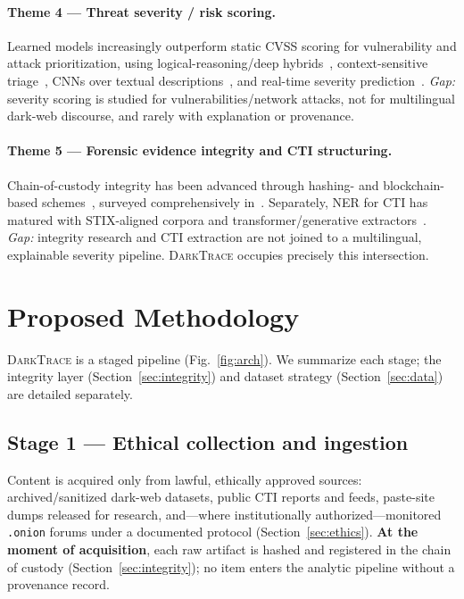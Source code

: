 \documentclass[11pt,a4paper]{article}
\newcommand{\framework}{\textsc{DarkTrace}}
\begin{document}
\paragraph{Theme 4 --- Threat severity / risk scoring.}
Learned models increasingly outperform static CVSS scoring for vulnerability and attack
prioritization, using logical-reasoning/deep hybrids~\cite{zeng2022licality,zeng2024illation},
context-sensitive triage~\cite{hore2023triage}, CNNs over textual
descriptions~\cite{saklani2025severity}, and real-time severity
prediction~\cite{amora2025realtime}. \emph{Gap:} severity scoring is studied for
vulnerabilities/network attacks, not for multilingual dark-web discourse, and rarely
with explanation or provenance.

\paragraph{Theme 5 --- Forensic evidence integrity and CTI structuring.}
Chain-of-custody integrity has been advanced through hashing- and blockchain-based
schemes~\cite{lone2019forensicchain,ali2022procedure,pontecuevas2025blockchain,patil2024potential},
surveyed comprehensively in~\cite{loffi2025management}. Separately, NER for CTI has
matured with STIX-aligned corpora and transformer/generative
extractors~\cite{echchammakhy2025cyberner,feng2025promptbart,wang2022aptner,evangelatos2021ner,kim2020automatic,sorokoletova2024scalable}.
\emph{Gap:} integrity research and CTI extraction are not joined to a multilingual,
explainable severity pipeline. \framework{} occupies precisely this intersection.

\section{Proposed Methodology}\label{sec:methodology}

\framework{} is a staged pipeline (Fig.~\ref{fig:arch}). We summarize each stage; the
integrity layer (Section~\ref{sec:integrity}) and dataset strategy
(Section~\ref{sec:data}) are detailed separately.

\subsection{Stage 1 --- Ethical collection and ingestion}
Content is acquired only from lawful, ethically approved sources: archived/sanitized
dark-web datasets, public CTI reports and feeds, paste-site dumps released for research,
and---where institutionally authorized---monitored \texttt{.onion} forums under a
documented protocol (Section~\ref{sec:ethics}). \textbf{At the moment of acquisition},
each raw artifact is hashed and registered in the chain of custody
(Section~\ref{sec:integrity}); no item enters the analytic pipeline without a
provenance record.
\end{document}
